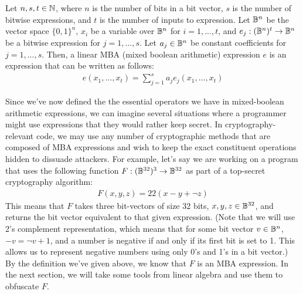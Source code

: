  {Let $n,s,t \in \mathbb{N}$, where $n$ is the number of bits in a bit vector, 
$s$ is the number of bitwise expressions, and $t$ is the number of 
inputs to expression.
Let $\mathbb{B}^n$ be the vector space $\{0,1\}^n$, $x_i$ be a variable over $\mathbb{B}^n$ for
$i = 1,...,t$, and $e_j : (\mathbb{B}^n)^t \rightarrow \mathbb{B}^n$ be a bitwise expression for
$j = 1,...,s$. Let $a_j\in \mathbb{B}^n$ be constant coefficients for $j = 1,...,s$.
Then, a linear MBA (mixed boolean arithmetic) expression $e$ is an expression that can be written as follows:
\begin{align*}
    e(x_1, ..., x_t) = \sum_{j=1}^s a_j e_j(x_1,...,x_t)
\end{align*}
}
\par Since we've now defined the the essential operators we have in mixed-boolean 
arithmetic
expressions, we can imagine several situations where a programmer might use expressions 
that they would rather keep secret. In cryptography-relevant code, we may use any
number of cryptographic methods that are composed of MBA 
expressions
and wish to keep the exact constituent operations hidden 
to dissuade attackers. For example, let's say we are working on a 
program that uses the following function $F : (\mathbb{B}^{32})^3 \rightarrow \mathbb{B}^{32}$ as part
of a top-secret cryptography algorithm:
\begin{align*}
    F(x, y, z) = 22(x - y + \neg z)
\end{align*}
This means  that $F$ takes three bit-vectors of size 32 bits, $x, y, z \in \mathbb{B}^{32}$, 
and returns the bit vector equivalent to that given expression. 
(Note that we will use 2's complement representation, which means that for some
bit vector $v \in \mathbb{B}^n$, $-v = \neg v + 1$, and a number is negative if and only if
its first bit is set to 1. This allows us to represent negative
numbers using only 0's and 1's in a bit vector.)
By the definition we've given above, we know that $F$ is an MBA expression. 
In the next section, 
we will take some tools from linear algebra and use them to obfuscate $F$.
